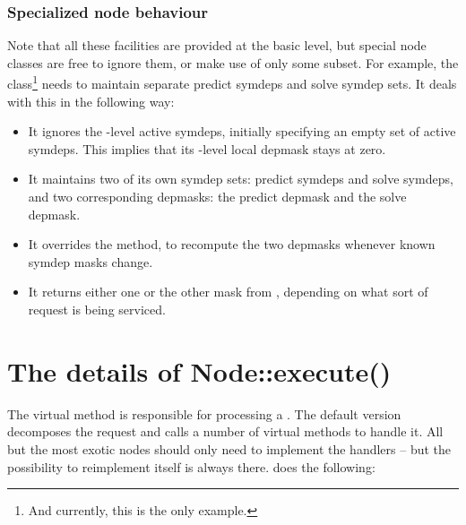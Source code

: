 \documentclass[10pt]{article}
\begin{document}
\subsubsection{Specialized node behaviour}  
  
  Note that all these facilities are provided at the basic  level, but
  special node classes are free to ignore them, or make use of only some
  subset. For example, the  class\footnote{And currently, this is the
  only example.} needs to maintain separate predict symdeps and solve symdep
  sets. It deals with this in the following way:

  \begin{itemize}
  
  \item It ignores the -level active symdeps, initially specifying an
    empty set of active symdeps. This implies that its -level local
    depmask stays at zero.

  \item It maintains two of its own symdep sets: predict symdeps and solve
    symdeps, and two corresponding depmasks: the predict depmask and the solve
    depmask.
    
  \item It overrides the  method, to recompute the two
    depmasks whenever known symdep masks change.
    
  \item It returns either one or the other mask from , depending
    on what sort of request is being serviced.

  \end{itemize}
  
\section{The details of Node::execute()}

  The virtual  method is responsible for processing a
  \Request. The default version decomposes the request and calls a number of
  virtual methods to handle it. All but the most exotic nodes should only need
  to implement the handlers -- but the possibility to reimplement
   itself is always there.  does the
  following:
\end{document}
